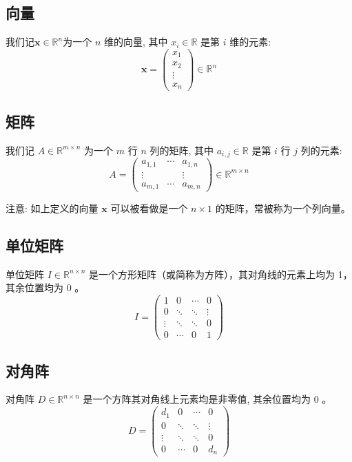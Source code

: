\subsection{向量}
我们记$\boldsymbol{x}\in \mathbb{R}^n$为一个 $n$ 维的向量, 其中 $x_i \in \mathbb{R}$ 是第 $i$ 维的元素:
$$
\boldsymbol{x}=\left(\begin{array}{c}
x_1 \\
x_2 \\
\vdots \\
x_n
\end{array}\right) \in \mathbb{R}^n
$$

\subsection{矩阵}
我们记 $A \in \mathbb{R}^{m \times n}$ 为一个 $m$ 行 $n$ 列的矩阵, 其中 $a_{i, j} \in \mathbb{R}$ 是第 $i$ 行 $j$ 列的元素:
$$
A=\left(\begin{array}{ccc}
a_{1,1} & \cdots & a_{1, n} \\
\vdots & & \vdots \\
a_{m, 1} & \cdots & a_{m, n}
\end{array}\right) \in \mathbb{R}^{m \times n}
$$

注意: 如上定义的向量 $\boldsymbol{x}$ 可以被看做是一个 $n \times 1$ 的矩阵，常被称为一个列向量。


\subsection{单位矩阵}

单位矩阵 $I \in \mathbb{R}^{n \times n}$ 是一个方形矩阵（或简称为方阵），其对角线的元素上均为 1， 其余位置均为 0 。
$$
I=\left(\begin{array}{cccc}
1 & 0 & \cdots & 0 \\
0 & \ddots & \ddots & \vdots \\
\vdots & \ddots & \ddots & 0 \\
0 & \cdots & 0 & 1
\end{array}\right)
$$



\subsection{对角阵}

对角阵 $D \in \mathbb{R}^{n \times n}$ 是一个方阵其对角线上元素均是非零值, 其余位置均为 0 。
$$
D=\left(\begin{array}{cccc}
d_1 & 0 & \cdots & 0 \\
0 & \ddots & \ddots & \vdots \\
\vdots & \ddots & \ddots & 0 \\
0 & \cdots & 0 & d_n
\end{array}\right)
$$

